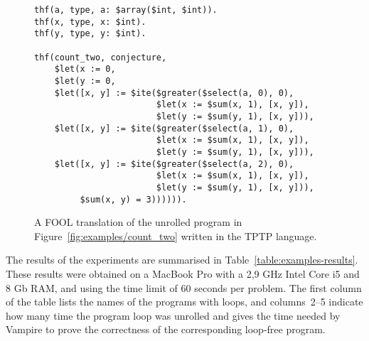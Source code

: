 
\begin{figure}[ht]
\begin{lstlisting}[language=tptp]
thf(a, type, a: $array($int, $int)).
thf(x, type, x: $int).
thf(y, type, y: $int).

thf(count_two, conjecture,
    $let(x := 0,
    $let(y := 0,
    $let([x, y] := $ite($greater($select(a, 0), 0),
                        $let(x := $sum(x, 1), [x, y]),
                        $let(y := $sum(y, 1), [x, y])),
    $let([x, y] := $ite($greater($select(a, 1), 0),
                        $let(x := $sum(x, 1), [x, y]),
                        $let(y := $sum(y, 1), [x, y])),
    $let([x, y] := $ite($greater($select(a, 2), 0),
                        $let(x := $sum(x, 1), [x, y]),
                        $let(y := $sum(y, 1), [x, y])),
         $sum(x, y) = 3)))))).
\end{lstlisting}
  \caption{A FOOL translation of the unrolled program in Figure~\ref{fig:examples/count_two} written in the TPTP language.}
  \label{fig:examples/count_two_tptp}
\end{figure}

The results of the experiments are summarised in Table~\ref{table:examples-results}. These results were obtained on a MacBook Pro with a 2,9 GHz Intel Core i5 and 8 Gb RAM, and using the time limit of 60 seconds per problem.  The first column of the table lists the
names of the programs with loops, and columns~2--5 indicate how many
time the program loop was unrolled and gives the time needed by
Vampire to prove the correctness of the corresponding loop-free
program. %


